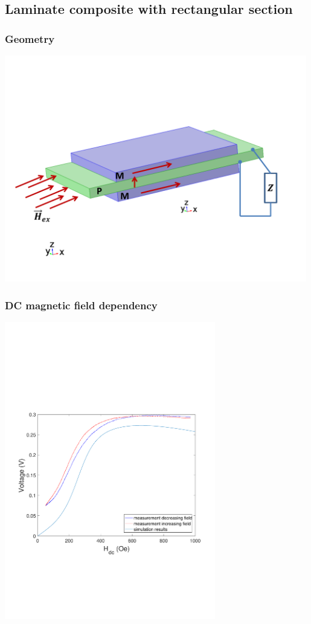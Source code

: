 \documentclass[compress]{beamer}
\begin{document}
\subsection{Laminate composite with rectangular section}
\begin{frame}\frametitle{Geometry}
\includegraphics[width=0.99\textwidth]{Graphic/03_georecta.pdf}
\end{frame}

\begin{frame}\frametitle{DC magnetic field dependency}
 \includegraphics[width=0.69\textwidth]{Graphic/03_volta_bias_recta.pdf}
\end{frame}
\end{document}
